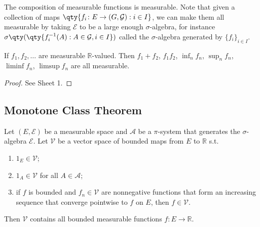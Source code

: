 \begin{example}
	The composition of measurable functions is measurable.
	Note that given a collection of maps $\qty{f_i \colon E \to (G,\mathcal G) : i \in I}$, we can make them all measurable by taking $\mathcal E$ to be a large enough $\sigma$-algebra, for instance $\sigma\qty(\qty{f_i^{-1}(A) : A \in \mathcal G, i \in I})$ called the $\sigma$-algebra generated by $\{f_i\}_{i \in I}$.
\end{example}

\begin{proposition}
	If $f_1, f_2, \dots$ are measurable $\mathbb{R}$-valued. Then $f_1 + f_2$, $f_1 f_2$, $\inf_n f_n$, $\sup_n f_n$, $\liminf f_n$, $\limsup f_n$ are all measurable.
\end{proposition}

\begin{proof}
	See Sheet 1.
\end{proof}

\subsection{Monotone Class Theorem}
\begin{theorem} \label{thm:monclass}
	Let $(E, \mathcal{E})$ be a measurable space and $\mathcal A$ be a $\pi$-system that generates the $\sigma$-algebra $\mathcal E$.
	Let $\mathcal V$ be a vector space of bounded maps from $E$ to $\mathbb R$ s.t.
	\begin{enumerate}
		\item $1_E \in \mathcal V$;
		\item $1_A \in \mathcal V$ for all $A \in \mathcal A$;
		\item if $f$ is bounded and $f_n \in \mathcal V$ are nonnegative functions that form an increasing sequence that converge pointwise to $f$ on $E$, then $f \in \mathcal V$.
	\end{enumerate}
	Then $\mathcal V$ contains all bounded measurable functions $f \colon E \to \mathbb R$.
\end{theorem}

